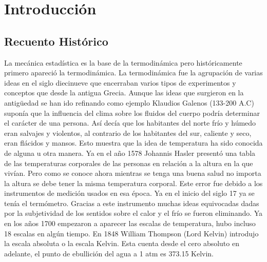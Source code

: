 \chapter{Introducción}

\section{Recuento Histórico}

La mecánica estadística es la base de la termodinámica pero históricamente primero apareció la termodinámica. La termodinámica fue la agrupación de varias ideas en el siglo diecinueve que encerraban varios tipos de experimentos  y conceptos que desde la antigua Grecia. Aunque las ideas que surgieron en la antigüedad se han ido refinando como ejemplo Klaudios Galenos (133-200 A.C) suponía que la influencia del clima sobre los fluidos del cuerpo podría determinar el carácter de una persona. Así decía que los habitantes del norte frío y húmedo eran salvajes y violentos, al contrario de los habitantes del sur, caliente y seco, eran flácidos y mansos. Esto muestra que la idea de temperatura ha sido conocida de alguna u otra manera. Ya en el año 1578  Johannis Hasler presentó una tabla de las temperaturas corporales de las personas en relación a la altura en la que vivían. Pero como se conoce ahora mientras se tenga una buena salud no importa la altura se debe tener la misma temperatura corporal. Este error fue debido a los instrumentos de medición usados en esa época. Ya en el inicio del siglo 17 ya se tenía el termómetro. Gracias a este instrumento muchas ideas equivocadas dadas por la subjetividad de los sentidos sobre el calor y el frío se fueron eliminando. Ya en los años 1700 empezaron a aparecer las escalas de temperatura, hubo incluso 18 escalas en algún tiempo. En 1848 William Thompson (Lord Kelvin)  introdujo la escala absoluta o la escala Kelvin. Esta cuenta desde el cero absoluto en adelante, el punto de ebullición del agua a  1 atm es 373.15 Kelvin.
\\
